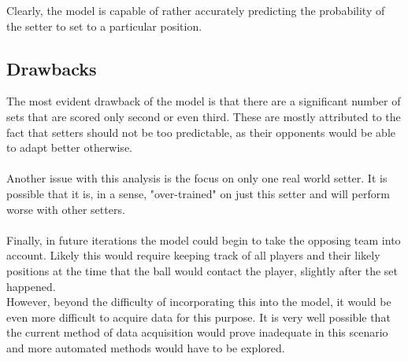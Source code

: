 \documentclass[main.tex]{subfiles}
\begin{document}
        Clearly, the model is capable of rather accurately predicting the probability of the setter to set to a particular position.
        
      \subsection{Drawbacks}
        
        The most evident drawback of the model is that there are a significant number of sets that are scored only second or even third. These are mostly attributed to the fact that setters should not be too predictable, as their opponents would be able to adapt better otherwise. 
        \\\\
        Another issue with this analysis is the focus on only one real world setter. It is possible that it is, in a sense, "over-trained" on just this setter and will perform worse with other setters.
        \\\\Finally, in future iterations the model could begin to take the opposing team into account. Likely this would require keeping track of all players and their likely positions at the time that the ball would contact the player, slightly after the set happened. \\
       However, beyond the difficulty of incorporating this into the model, it would be even more difficult to acquire data for this purpose. It is very well possible that the current method of data acquisition would prove inadequate in this scenario and more automated methods would have to be explored.
      
\end{document}
